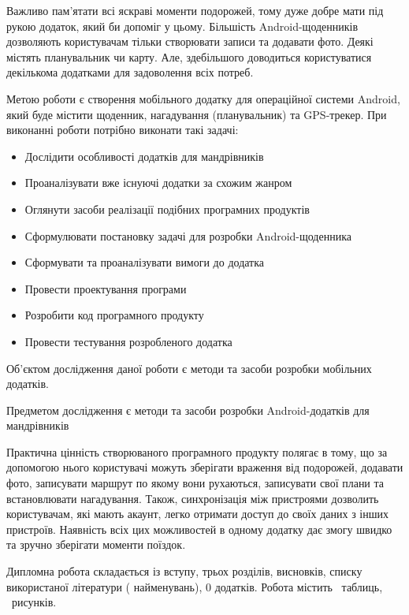 \documentclass[../main.tex]{subfiles}
\begin{document}
Важливо пам'ятати всі яскраві моменти подорожей, тому дуже добре мати під рукою додаток, який би допоміг у цьому. Більшість Android-щоденників дозволяють користувачам тільки створювати записи та додавати фото. Деякі містять планувальник чи карту. Але, здебільшого доводиться користуватися декількома додатками для задоволення всіх потреб.

Метою роботи є створення мобільного додатку для операційної системи Android, який буде містити щоденник, нагадування (планувальник) та GPS-трекер.  
При виконанні роботи потрібно виконати такі задачі:
\begin{itemize}
\item Дослідити особливості додатків для мандрівників
\item Проаналізувати вже існуючі додатки за схожим жанром
\item Оглянути засоби реалізації подібних програмних продуктів
\item Сформулювати постановку задачі для розробки Android-щоденника
\item Сформувати та проаналізувати вимоги до додатка
\item Провести проектування програми
\item Розробити код програмного продукту
\item Провести тестування розробленого додатка
\end{itemize}

Об'єктом дослідження даної роботи є методи та засоби розробки мобільних додатків. 

Предметом дослідження є методи та засоби розробки Android-додатків для мандрівників

Практична цінність створюваного програмного продукту полягає в тому, що за допомогою нього користувачі можуть зберігати враження від подорожей, додавати фото, записувати маршрут по якому вони рухаються, записувати свої плани та встановлювати нагадування. Також, синхронізація між пристроями дозволить користувачам, які мають акаунт, легко отримати доступ до своїх даних з інших пристроїв. Наявність всіх цих можливостей в одному додатку дає змогу швидко та зручно зберігати моменти поїздок.

Дипломна робота складається із вступу, трьох розділів, висновків, списку використаної літератури ( найменувань), 0 додатків. Робота містить \totaltables\ таблиць, \totalfigures\ рисунків. 
\end{document}
